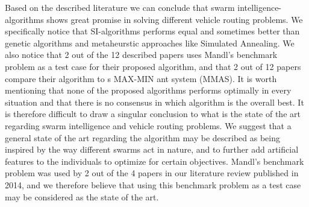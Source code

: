 Based on the described literature we can conclude that swarm intelligence-algorithms shows great promise in solving different vehicle routing problems. We specifically notice that SI-algorithms performs equal and sometimes better than genetic algorithms and  metaheurstic approaches like Simulated Annealing. We also notice that 2 out of the 12 described papers uses Mandl's benchmark problem as a test case for their proposed algorithm, and that 2 out of 12 papers compare their algorithm to \citet{stutzle99}s MAX-MIN ant system (MMAS). It is worth mentioning that none of the proposed algorithms performs optimally in every situation and that there is no consensus in which algorithm is the overall best. It is therefore difficult to draw a singular conclusion to what is the state of the art regarding swarm intelligence and vehicle routing problems. We suggest that a general state of the art regarding the algorithm may be described as being inspired by the way different swarms act in nature, and to further add artificial features to the individuals to optimize for certain objectives. Mandl's benchmark problem was used by 2 out of the 4 papers in our literature review published in 2014, and we therefore believe that using this benchmark problem as a test case may be considered as the state of the art.



